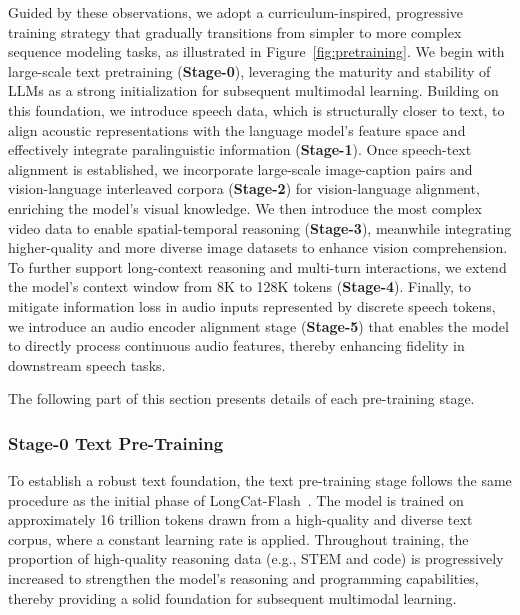 \documentclass{article}
\newcommand{\longcat}{LongCat-Flash-Omni\xspace}
\begin{document}
Guided by these observations, we adopt a curriculum-inspired, progressive training strategy that gradually transitions from simpler to more complex sequence modeling tasks, as illustrated in Figure~\ref{fig:pretraining}.
We begin with large-scale text pretraining (\textbf{Stage-0}), leveraging the maturity and stability of LLMs as a strong initialization for subsequent multimodal learning. Building on this foundation, we introduce speech data, which is structurally closer to text, to align acoustic representations with the language model’s feature space and effectively integrate paralinguistic information (\textbf{Stage-1}). Once speech-text alignment is established, we incorporate large-scale image-caption pairs and vision-language interleaved corpora (\textbf{Stage-2}) for vision-language alignment, enriching the model’s visual knowledge. We then introduce the most complex video data to enable spatial-temporal reasoning (\textbf{Stage-3}), meanwhile integrating higher-quality and more diverse image datasets to enhance vision comprehension. 
To further support long-context reasoning and multi-turn interactions, we extend the model’s context window from 8K to 128K tokens (\textbf{Stage-4}). 
Finally, to mitigate information loss in audio inputs represented by discrete speech tokens, we introduce an audio encoder alignment stage (\textbf{Stage-5}) that enables the model to directly process continuous audio features, thereby enhancing fidelity in downstream speech tasks.

The following part of this section presents details of each pre-training stage.


\subsubsection{Stage-0 Text Pre-Training}
\label{subsec:stage-0}
To establish a robust text foundation, the text pre-training stage follows the same procedure as the initial phase of LongCat-Flash~\citep{meituan2025longcat_flash_chat}. The model is trained on approximately 16 trillion tokens drawn from a high-quality and diverse text corpus, where a constant learning rate is applied.
Throughout training, the proportion of high-quality reasoning data (e.g., STEM and code) is progressively increased to strengthen the model’s reasoning and programming capabilities, thereby providing a solid foundation for subsequent multimodal learning.
\end{document}
